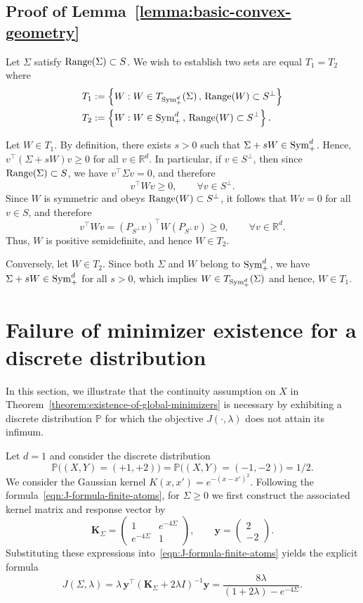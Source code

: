 \documentclass[sn-mathphys-num]{sn-jnl}%
\numberwithin{equation}{section}
\renewcommand{\P}{\mathbb{P}}
\newcommand{\Range}{{\rm Range}}
\newcommand{\Sym}{{\rm \mathrm{Sym}}}
\theoremstyle{thmstyleone}%
\theoremstyle{thmstyletwo}%
\theoremstyle{thmstylethree}%
\begin{document}
\subsection{Proof of Lemma~\ref{lemma:basic-convex-geometry}}
\label{sec:proof-of-lemma-basic-convex-geometry}
\indent\indent
Let $\Sigma$ satisfy $\Range(\Sigma) \subset S$.  We wish to establish two sets are equal $T_1 = T_2$ where
\begin{equation*}
\begin{split} 
	T_1&:= \left\{W: W \in T_{\Sym_+^d}(\Sigma) \, , \, \Range(W)\subset S^\perp\right\} \\
	T_2&:= \left\{W: W \in \Sym_+^d \, , \, \Range(W)\subset S^\perp\right\}.
\end{split} 
\end{equation*}

Let $W \in T_1$. By definition, there exists $s > 0$ such that
$\Sigma + s W \in \Sym_+^d$. Hence,
$v^\top (\Sigma + s W) v \ge 0$ for all $v \in \mathbb{R}^d$. 
In particular, if $v \in S^\perp$, then since
$\Range(\Sigma) \subset S$, we have $v^\top \Sigma v = 0$, and therefore
\[
v^\top W v \ge 0, \qquad \forall v \in S^\perp.
\] 
Since $W$ is symmetric and obeys $\Range(W) \subset S^\perp$, it follows that
$Wv = 0$ for all $v \in S$, and therefore
\[
v^\top W v = (P_{S^\perp} v)^\top W (P_{S^\perp} v) \ge 0, \qquad \forall  v \in \mathbb{R}^d.
\]
Thus, $W$ is positive semidefinite, and hence $W \in T_2$.

Conversely, let $W \in T_2$.  Since both $\Sigma$ and $W$ belong to $\Sym_+^d$,
we have $\Sigma + sW \in \Sym_+^d$ for all $s > 0$, which implies $W \in T_{\Sym_+^d}(\Sigma)$ and hence, $W \in T_1$.

\section{Failure of minimizer existence for a discrete distribution}
\label{sec:discrete-counterexample}
\indent\indent
In this section, we illustrate that the continuity assumption on $X$ in
Theorem~\ref{theorem:existence-of-global-minimizers} is necessary by exhibiting
a discrete distribution $\P$ for which the objective $J(\cdot,\lambda)$ does not attain
its infimum.


Let $d=1$ and consider the discrete distribution
\[
\P\big((X,Y)=(+1,+2)\big)
=
\P\big((X,Y)=(-1,-2)\big)
=
1/2.
\]
We consider the Gaussian kernel $K(x,x')=e^{-(x-x')^2}$.
Following the formula~\eqref{eqn:J-formula-finite-atoms}, 
for $\Sigma\ge 0$ we first construct the associated kernel matrix and response vector by
\[
\mathbf{K}_\Sigma
=
\begin{pmatrix}
1 & e^{-4\Sigma} \\
e^{-4\Sigma} & 1
\end{pmatrix},
\qquad
\mathbf{y}=\begin{pmatrix} 2 \\ - 2 \end{pmatrix}.
\]
Substituting these expressions into~\eqref{eqn:J-formula-finite-atoms} yields the explicit formula
\[
J(\Sigma,\lambda)
=
\lambda\,\mathbf{y}^\top(\mathbf{K}_\Sigma+2\lambda I)^{-1}\mathbf{y}
=
\frac{8\lambda}{(1+2\lambda)-e^{-4\Sigma}}.
\]
\end{document}
